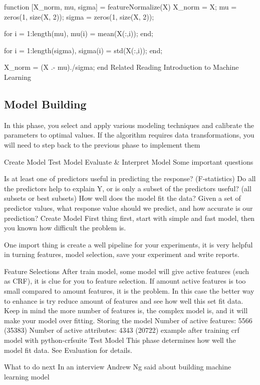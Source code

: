function [X_norm, mu, sigma] = featureNormalize(X)
X_norm = X;
mu = zeros(1, size(X, 2)); %
sigma = zeros(1, size(X, 2)); %

for i = 1:length(mu),
mu(i) = mean(X(:,i));
end;

for i = 1:length(sigma),
sigma(i) = std(X(:,i));
end;

X_norm = (X .- mu)./sigma;
end
Related Reading
Introduction to Machine Learning

\subsection{Model Building}

In this phase, you select and apply various modeling techniques and calibrate the parameters to optimal values. If the algorithm requires data transformations, you will need to step back to the previous phase to implement them

Create Model
Test Model
Evaluate & Interpret Model
Some important questions

Is at least one of predictors useful in predicting the response? (F-statistics)
Do all the predictors help to explain Y, or is only a subset of the predictors useful? (all subsets or best subsets)
How well does the model fit the data?
Given a set of predictor values, what response value should we predict, and how accurate is our prediction?
Create Model
First thing first, start with simple and fast model, then you known how difficult the problem is.

One import thing is create a well pipeline for your experiments, it is very helpful in turning features, model selection, save your experiment and write reports.

Feature Selections
After train model, some model will give active features (such as CRF), it is clue for you to feature selection. If amount active features is too small compared to amount features, it is the problem. In this case the better way to enhance is try reduce amount of features and see how well this set fit data. Keep in mind the more number of features is, the complex model is, and it will make your model over fitting.
Storing the model
Number of active features: 5566 (35383)
Number of active attributes: 4343 (20722)
example after training crf model with python-crfsuite
Test Model
This phase determines how well the model fit data. See Evaluation for details.

What to do next
In an interview Andrew Ng said about building machine learning model

